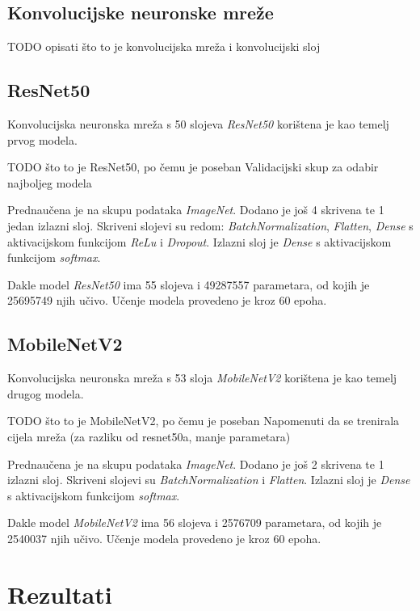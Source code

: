 \documentclass[conference, utf8]{IEEEtran}
\begin{document}
\subsection{Konvolucijske neuronske mreže}

TODO opisati što to je konvolucijska mreža i konvolucijski sloj



\subsection{ResNet50}
Konvolucijska neuronska mreža s 50 slojeva \textit{ResNet50} korištena je kao temelj prvog modela.



TODO što to je ResNet50, po čemu je poseban
Validacijski skup za odabir najboljeg modela



 Prednaučena je na skupu podataka \textit{ImageNet}. Dodano je još 4 skrivena te 1 jedan izlazni sloj. Skriveni slojevi su redom: \textit{BatchNormalization}, \textit{Flatten}, \textit{Dense} s aktivacijskom funkcijom \textit{ReLu} i \textit{Dropout}. Izlazni sloj je \textit{Dense} s aktivacijskom funkcijom \textit{softmax}.

Dakle model \textit{ResNet50} ima 55 slojeva i 49287557 parametara, od kojih je 25695749 njih učivo. Učenje modela provedeno je kroz 60 epoha.


\subsection{MobileNetV2}
Konvolucijska neuronska mreža s 53 sloja \textit{MobileNetV2} korištena je kao temelj drugog modela.



TODO što to je MobileNetV2, po čemu je poseban
 Napomenuti da se trenirala cijela mreža (za razliku od resnet50a, manje parametara)



 Prednaučena je na skupu podataka \textit{ImageNet}. Dodano je još 2 skrivena te 1 izlazni sloj. Skriveni slojevi su  \textit{BatchNormalization} i \textit{Flatten}. Izlazni sloj je \textit{Dense} s aktivacijskom funkcijom \textit{softmax}.

Dakle model \textit{MobileNetV2} ima 56 slojeva i 2576709 parametara, od kojih je 2540037 njih učivo. Učenje modela provedeno je kroz 60 epoha.



\section{Rezultati}
\end{document}
